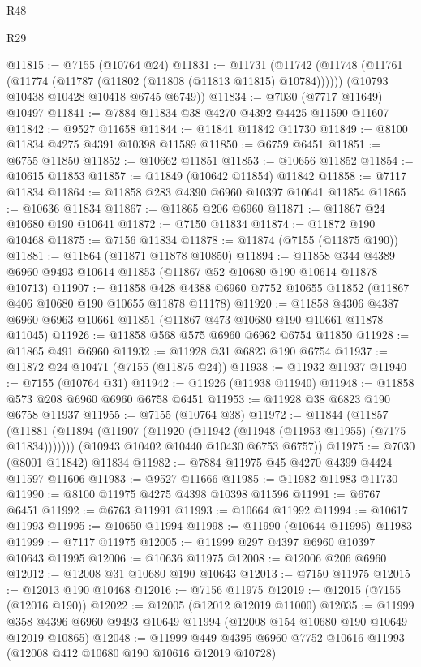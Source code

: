 \begin{lexlean}{R48}
\begin{lexlean}{R29}
\begin{coremodule}
{{{{{{{{{{{{{{{{{{{{{{{{{{{{{{{{{{{{{{{{{{{{{{{{{{{{{{{{{{{{{{{{{{{{{{{{{{{{{{{{{{{{{{{{{{{{{{{{{{{{{{{{{{{{{{{{{{{{{{{{{{{{{{{{{{{{{{{{{{{{{{{{{{{{{{{{{{{{{{{{{{{{{{{{{{{{{{{{{{{{{{{{{{{{{{{{{{{{{{{{{{{{{{{{{{{{{{{{{{@11815 := @7155 (@10764 @24)
@11831 := @11731
    (@11742
      (@11748 (@11761 (@11774 (@11787 (@11802 (@11808 (@11813 @11815) @10784))))))
      (@10793 @10438 @10428 @10418 @6745 @6749))
@11834 := @7030 (@7717 @11649) @10497
@11841 := @7884 @11834 @38 @4270 @4392 @4425 @11590 @11607
@11842 := @9527 @11658
@11844 := @11841 @11842 @11730
@11849 := @8100 @11834 @4275 @4391 @10398 @11589
@11850 := @6759 @6451
@11851 := @6755 @11850
@11852 := @10662 @11851
@11853 := @10656 @11852
@11854 := @10615 @11853
@11857 := @11849 (@10642 @11854) @11842
@11858 := @7117 @11834
@11864 := @11858 @283 @4390 @6960 @10397 @10641 @11854
@11865 := @10636 @11834
@11867 := @11865 @206 @6960
@11871 := @11867 @24 @10680 @190 @10641
@11872 := @7150 @11834
@11874 := @11872 @190 @10468
@11875 := @7156 @11834
@11878 := @11874 (@7155 (@11875 @190))
@11881 := @11864 (@11871 @11878 @10850)
@11894 := @11858 @344 @4389 @6960 @9493 @10614 @11853 (@11867 @52 @10680 @190 @10614 @11878 @10713)
@11907 := @11858 @428 @4388 @6960 @7752 @10655 @11852 (@11867 @406 @10680 @190 @10655 @11878 @11178)
@11920 := @11858
    @4306
    @4387
    @6960
    @6963
    @10661
    @11851
    (@11867 @473 @10680 @190 @10661 @11878 @11045)
@11926 := @11858 @568 @575 @6960 @6962 @6754 @11850
@11928 := @11865 @491 @6960
@11932 := @11928 @31 @6823 @190 @6754
@11937 := @11872 @24 @10471 (@7155 (@11875 @24))
@11938 := @11932 @11937
@11940 := @7155 (@10764 @31)
@11942 := @11926 (@11938 @11940)
@11948 := @11858 @573 @208 @6960 @6960 @6758 @6451
@11953 := @11928 @38 @6823 @190 @6758 @11937
@11955 := @7155 (@10764 @38)
@11972 := @11844
    (@11857
      (@11881 (@11894 (@11907 (@11920 (@11942 (@11948 (@11953 @11955) (@7175 @11834)))))))
      (@10943 @10402 @10440 @10430 @6753 @6757))
@11975 := @7030 (@8001 @11842) @11834
@11982 := @7884 @11975 @45 @4270 @4399 @4424 @11597 @11606
@11983 := @9527 @11666
@11985 := @11982 @11983 @11730
@11990 := @8100 @11975 @4275 @4398 @10398 @11596
@11991 := @6767 @6451
@11992 := @6763 @11991
@11993 := @10664 @11992
@11994 := @10617 @11993
@11995 := @10650 @11994
@11998 := @11990 (@10644 @11995) @11983
@11999 := @7117 @11975
@12005 := @11999 @297 @4397 @6960 @10397 @10643 @11995
@12006 := @10636 @11975
@12008 := @12006 @206 @6960
@12012 := @12008 @31 @10680 @190 @10643
@12013 := @7150 @11975
@12015 := @12013 @190 @10468
@12016 := @7156 @11975
@12019 := @12015 (@7155 (@12016 @190))
@12022 := @12005 (@12012 @12019 @11000)
@12035 := @11999 @358 @4396 @6960 @9493 @10649 @11994 (@12008 @154 @10680 @190 @10649 @12019 @10865)
@12048 := @11999 @449 @4395 @6960 @7752 @10616 @11993 (@12008 @412 @10680 @190 @10616 @12019 @10728)
}}}}}}}}}}}}}}}}}}}}}}}}}}}}}}}}}}}}}}}}}}}}}}}}}}}}}}}}}}}}}}}}}}}}}}}}}}}}}}}}}}}}}}}}}}}}}}}}}}}}}}}}}}}}}}}}}}}}}}}}}}}}}}}}}}}}}}}}}}}}}}}}}}}}}}}}}}}}}}}}}}}}}}}}}}}}}}}}}}}}}}}}}}}}}}}}}}}}}}}}}}}}}}}}}}}}}}}}}}
\end{coremodule}
\end{lexlean}
\end{lexlean}
